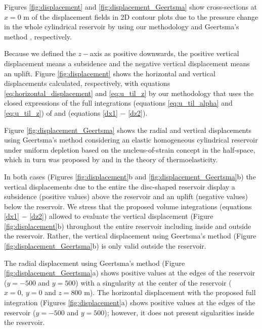 \documentclass[journal abbreviation, manuscript]{copernicus}
\begin{document}
Figures \ref{fig:displacement}  and \ref{fig:displacement_Geertsma}  show cross-sections at 
$x  = 0$ m of the displacement fields in 2D contour plots  due to the pressure change in the whole  cylindrical reservoir by using our methodology and Geertsma’s method \citep{Geertsma73}, respectively.

Because we defined the $z-$axis as positive downwards, the positive vertical displacement means a subsidence and the negative vertical displacement means an uplift.
Figure \ref{fig:displacement}  shows the horizontal and vertical displacements  calculated, respectively, with equations \ref{eq:horizontal_displacement} and \ref{eq:u_til_z} by our methodology that uses the closed expressions of the full integrations (equations \ref{eq:u_til_alpha} and \ref{eq:u_til_z}) of \cite{Nagyetal2000} and \cite{Nagyetal2002} (equations \ref{dx1} $-$ \ref{dz2}).

Figure \ref{fig:displacement_Geertsma} shows the radial and vertical displacements using Geertsma’s method \citep{Geertsma73}  considering an elastic homogeneous cylindrical reservoir under uniform depletion based on the nucleus-of-strain concept in the half-space, which in turn was proposed by \cite{Mindlin&Cheng50} and \cite{Sen51} in the theory of thermoelasticity.

In both cases (Figures \ref{fig:displacement}b and \ref{fig:displacement_Geertsma}b) the vertical displacements due to the entire the disc-shaped reservoir display a subsidence (positive values) above the reservoir and an uplift (negative values) below the reservoir.
We stress that the proposed volume integrations  (equations \ref{dx1} $-$ \ref{dz2})  allowed  to evaluate the  vertical displacement (Figure \ref{fig:displacement}b) throughout  the entire reservoir including inside and outside the reservoir.
Rather, the  vertical displacement using Geertsma’s method 
(Figure \ref{fig:displacement_Geertsma}b) is only valid outside the reservoir. 

The radial displacement using Geertsma’s method 
(Figure \ref{fig:displacement_Geertsma}a) shows positive values at the edges of the reservoir ($y= -500$ and $y = 500$) with a singularity at the center of the reservoir 
($x= 0, \: y = 0$ and $z = 800$ m). 
The horizontal displacement with the proposed full integration 
(Figures \ref{fig:displacement}a) shows positive values at the edges of the reservoir ($y= -500$ and $y = 500$); however, it does not present sigularities inside the reservoir.
 
\end{document}
